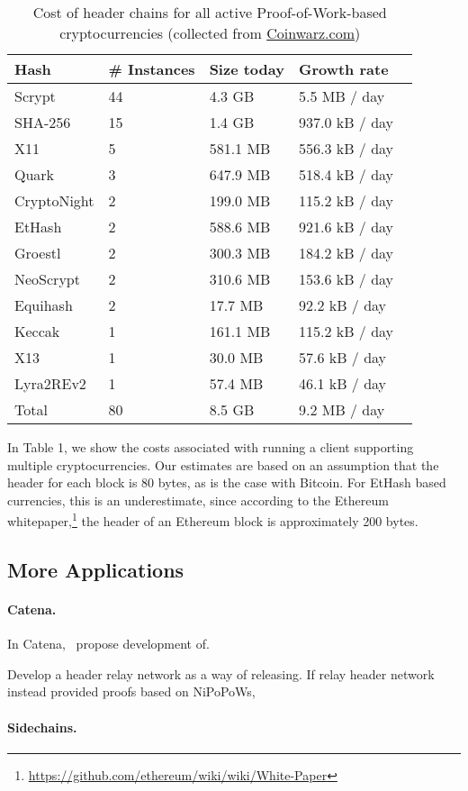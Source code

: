 \begin{table}
  \caption{Cost of header chains for all active Proof-of-Work-based cryptocurrencies (collected from \url{Coinwarz.com})}
\small
  \begin{tabular}{l|l|l|l}
    {\bf Hash} & {\bf \# Instances} & {\bf Size today} & {\bf Growth rate}  \\
    \hline
    Scrypt  & 44  & 4.3 GB  & 5.5 MB / day \  \\
    SHA-256  & 15  & 1.4 GB  & 937.0 kB / day \  \\
    X11  & 5  & 581.1 MB  & 556.3 kB / day \  \\
    Quark  & 3  & 647.9 MB  & 518.4 kB / day \  \\
    CryptoNight  & 2  & 199.0 MB  & 115.2 kB / day \  \\
    EtHash  & 2  & 588.6 MB  & 921.6 kB / day \  \\
    Groestl  & 2  & 300.3 MB  & 184.2 kB / day \  \\
    NeoScrypt  & 2  & 310.6 MB  & 153.6 kB / day \  \\
    Equihash  & 2  & 17.7 MB  & 92.2 kB / day \  \\
    Keccak  & 1  & 161.1 MB  & 115.2 kB / day \  \\
    X13  & 1  & 30.0 MB  & 57.6 kB / day \  \\
    Lyra2REv2  & 1  & 57.4 MB  & 46.1 kB / day \  \\
    \hline
    Total  & 80   &  8.5 GB  & 9.2 MB  / day  \\
  \end{tabular}
\end{table}

In Table 1, we show the costs associated with running a client supporting multiple cryptocurrencies. Our estimates are based on an assumption that the header for each block is 80 bytes, as is the case with Bitcoin. For EtHash based currencies, this is an underestimate, since according to the Ethereum whitepaper,\footnote{\url{https://github.com/ethereum/wiki/wiki/White-Paper}}
the header of an Ethereum block is approximately 200 bytes.

\subsection{More Applications}

\paragraph{Catena.}

In Catena,~\cite{} propose development of.


Develop a header relay network as a way of releasing.
If relay header network instead provided proofs based on NiPoPoWs, 

\paragraph{Sidechains.}


